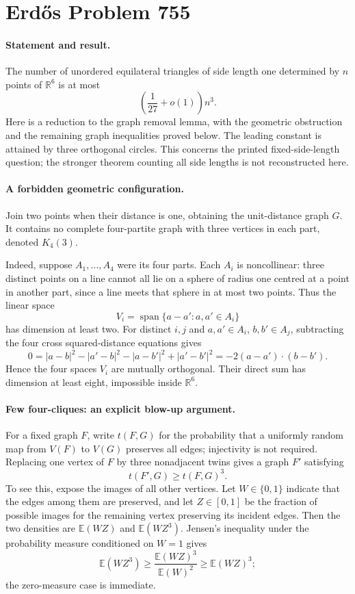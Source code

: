 \section*{Erd\H{o}s Problem 755}

\paragraph{Statement and result.}
The number of unordered equilateral triangles of side length one determined by \(n\) points of \(\mathbb R^6\) is at most
\[
 \left(\frac1{27}+o(1)\right)n^3.
\]
Here is a reduction to the graph removal lemma, with the geometric obstruction and the remaining graph inequalities proved below. The leading constant is attained by three orthogonal circles. This concerns the printed fixed-side-length question; the stronger theorem counting all side lengths is not reconstructed here.

\paragraph{A forbidden geometric configuration.}
Join two points when their distance is one, obtaining the unit-distance graph \(G\). It contains no complete four-partite graph with three vertices in each part, denoted \(K_4(3)\).

Indeed, suppose \(A_1,\ldots,A_4\) were its four parts. Each \(A_i\) is noncollinear: three distinct points on a line cannot all lie on a sphere of radius one centred at a point in another part, since a line meets that sphere in at most two points. Thus the linear space
\[
 V_i=\operatorname{span}\{a-a':a,a'\in A_i\}
\]
has dimension at least two. For distinct \(i,j\) and \(a,a'\in A_i\), \(b,b'\in A_j\), subtracting the four cross squared-distance equations gives
\[
 0=|a-b|^2-|a'-b|^2-|a-b'|^2+|a'-b'|^2
   =-2(a-a')\cdot(b-b').
\]
Hence the four spaces \(V_i\) are mutually orthogonal. Their direct sum has dimension at least eight, impossible inside \(\mathbb R^6\).

\paragraph{Few four-cliques: an explicit blow-up argument.}
For a fixed graph \(F\), write \(t(F,G)\) for the probability that a uniformly random map from \(V(F)\) to \(V(G)\) preserves all edges; injectivity is not required. Replacing one vertex of \(F\) by three nonadjacent twins gives a graph \(F'\) satisfying
\[
 t(F',G)\geq t(F,G)^3. \tag{1}
\]
To see this, expose the images of all other vertices. Let \(W\in\{0,1\}\) indicate that the edges among them are preserved, and let \(Z\in[0,1]\) be the fraction of possible images for the remaining vertex preserving its incident edges. Then the two densities are \(\mathbb E(WZ)\) and \(\mathbb E(WZ^3)\). Jensen's inequality under the probability measure conditioned on \(W=1\) gives
\[
 \mathbb E(WZ^3)\geq\frac{\mathbb E(WZ)^3}{\mathbb E(W)^2}
 \geq\mathbb E(WZ)^3;
\]
the zero-measure case is immediate.

